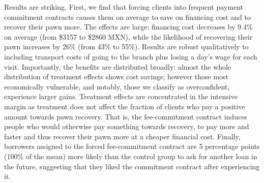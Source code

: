 \documentclass[oneside,11pt]{article}
\begin{document}
Results are striking. First, we find that forcing clients into frequent payment commitment contracts causes them on average to save on financing cost and to recover their pawn more. The effects are large: financing cost decreases by 9.4\% on average (from \$3157 to \$2860 MXN), while the likelihood of recovering their pawn increases by 26\% (from 43\% to 55\%). Results are robust qualitatively to including transport costs of going to the branch plus losing a day's wage for each visit. Importantly, the benefits are distributed broadly: almost the whole distribution of treatment effects shows cost savings; however those most economically vulnerable, and notably, those we classify as overconfident, experience larger gains. %
Treatment effects are concentrated in the intensive margin as treatment does not affect the fraction of clients who pay a positive amount towards pawn recovery. That is, the fee-commitment contract induces people who would otherwise pay something towards recovery, to pay more and faster and thus recover their pawn more at a cheaper financial cost. Finally, borrowers assigned to the forced fee-commitment contract are 5 percentage points (100\% of the mean) more likely than the control group to ask for another loan in the future, suggesting that they liked the commitment contract after experiencing it.

\end{document}

